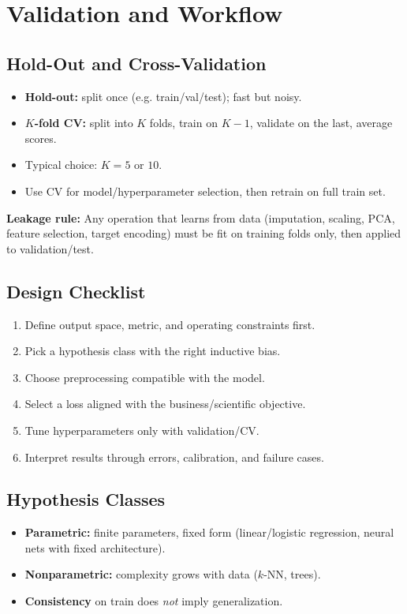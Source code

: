 \documentclass[10pt,twocolumn]{article}
\newcommand{\chead}[1]{\vspace{0.15em}\textbf{#1:} }
\begin{document}
\section{Validation and Workflow}
\subsection{Hold-Out and Cross-Validation}
\begin{itemize}
  \item \textbf{Hold-out:} split once (e.g. train/val/test); fast but noisy.
  \item \textbf{$K$-fold CV:} split into $K$ folds, train on $K-1$, validate on the last, average scores.
  \item Typical choice: $K=5$ or $10$.
  \item Use CV for model/hyperparameter selection, then retrain on full train set.
\end{itemize}
\chead{Leakage rule} Any operation that learns from data (imputation, scaling, PCA, feature selection, target encoding) must be fit on training folds only, then applied to validation/test.

\subsection{Design Checklist}
\begin{enumerate}
  \item Define output space, metric, and operating constraints first.
  \item Pick a hypothesis class with the right inductive bias.
  \item Choose preprocessing compatible with the model.
  \item Select a loss aligned with the business/scientific objective.
  \item Tune hyperparameters only with validation/CV.
  \item Interpret results through errors, calibration, and failure cases.
\end{enumerate}

\subsection{Hypothesis Classes}
\begin{itemize}
  \item \textbf{Parametric:} finite parameters, fixed form (linear/logistic regression, neural nets with fixed architecture).
  \item \textbf{Nonparametric:} complexity grows with data ($k$-NN, trees).
  \item \textbf{Consistency} on train does \emph{not} imply generalization.
\end{itemize}
\end{document}
